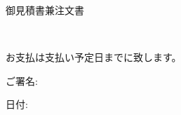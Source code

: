 \parbox{.8\textwidth}{
	  \centerline{\Large{御見積書兼注文書}} \\
}
\normalsize
\vspace{0.5cm}
\hfill

\parbox [t]{\textwidth} {
   お支払は支払い予定日までに致します。\\
}
\vspace{1.0cm}
\hfill

\parbox [t]{.5\textwidth} {
   ご署名: \\ \hline
}
\parbox [t]{.3\textwidth} {
    日付: \\ \hline
}   
